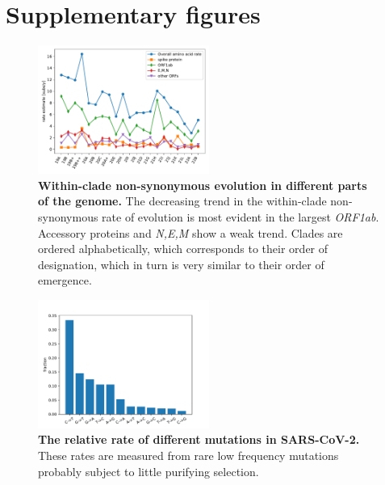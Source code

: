 \section*{Supplementary figures}

\setcounter{figure}{0}
\renewcommand{\figurename}{Figure S}
\setcounter{table}{0}
\renewcommand{\tablename}{Table S}

\begin{figure}[h]
    \includegraphics[width=0.5\textwidth]{figures/rate_progression_by_gene.pdf}
    \caption{{\bf Within-clade non-synonymous evolution in different parts of the genome.}
    The decreasing trend in the within-clade non-synonymous rate of evolution is most evident in the largest \emph{ORF1ab}.
    Accessory proteins and \emph{N,E,M} show a weak trend. Clades are ordered alphabetically, which corresponds to their order of designation, which in turn is very similar to their order of emergence.
    \label{fig:rate_progression_by_gene}}
\end{figure}

\begin{figure}[h]
    \includegraphics[width=0.5\textwidth]{figures/mutation_distribution.pdf}
    \caption{{\bf The relative rate of different mutations in SARS-CoV-2.}
    These rates are measured from rare low frequency mutations probably subject to little purifying selection.
    \label{fig:mutation_distribution}}
\end{figure}

